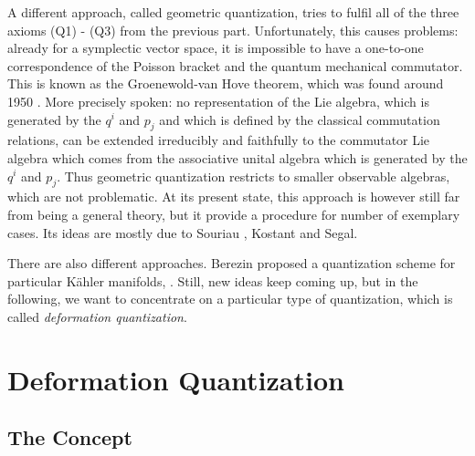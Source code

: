 A different approach, called geometric quantization, tries to fulfil all 
of the three axioms (Q1) - (Q3) from the previous part. Unfortunately, this 
causes problems: already for a symplectic vector space, it is impossible to have a 
one-to-one correspondence of the Poisson bracket and the quantum mechanical 
commutator. This is known as the Groenewold-van Hove theorem, which was found 
around 1950 \cite{vanhove:1951a, groenewold:1946a}. More precisely spoken: no 
representation of the Lie algebra, which is generated by the $q^i$ and $p_j$ and 
which is defined by the classical commutation relations, can be extended 
irreducibly and faithfully to the commutator Lie algebra which comes from the 
associative unital algebra which is generated by the $q^i$ and $p_j$. Thus 
geometric quantization restricts to smaller observable algebras, which are not 
problematic. At its present state, this approach is however still far from being a 
general theory, but it provide a procedure for number of exemplary cases. Its 
ideas are mostly due to Souriau \cite{souriau:1970a}, Kostant and Segal.


There are also different approaches. Berezin proposed a quantization scheme for 
particular K\"ahler manifolds, \cite{berezin:1975a, berezin:1975b, berezin:1975c}. 
Still, new ideas keep coming up, but in the following, we want to concentrate on a 
particular type of quantization, which is called \emph{deformation quantization}.



\section{Deformation Quantization}
\label{sec:chap2_DQ}

\subsection{The Concept}
\label{subsec:chap2_Concept}

